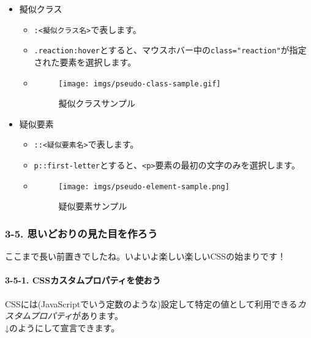 \begin{itemize}
\tightlist
\item
  擬似クラス

  \begin{itemize}
  \item
    \texttt{:\textless{}擬似クラス名\textgreater{}}で表します。
  \item
    \texttt{.reaction:hover}とすると、マウスホバー中の\texttt{class="reaction"}が指定された要素を選択します。
  \item
    \begin{figure}
    \centering
    \texttt{[image: imgs/pseudo-class-sample.gif]}
    \caption{擬似クラスサンプル}
    \end{figure}
  \end{itemize}
\item
  疑似要素

  \begin{itemize}
  \item
    \texttt{::\textless{}疑似要素名\textgreater{}}で表します。
  \item
    \texttt{p::first-letter}とすると、\texttt{\textless{}p\textgreater{}}要素の最初の文字のみを選択します。
  \item
    \begin{figure}
    \centering
    \texttt{[image: imgs/pseudo-element-sample.png]}
    \caption{疑似要素サンプル}
    \end{figure}
  \end{itemize}
\end{itemize}

\subsubsection{3-5.
思いどおりの見た目を作ろう}\label{ux601dux3044ux3069ux304aux308aux306eux898bux305fux76eeux3092ux4f5cux308dux3046}

ここまで長い前置きでしたね。いよいよ楽しい楽しいCSSの始まりです！

\paragraph{3-5-1.
CSSカスタムプロパティを使おう}\label{cssux30abux30b9ux30bfux30e0ux30d7ux30edux30d1ux30c6ux30a3ux3092ux4f7fux304aux3046}

CSSには(JavaScriptでいう定数のような)設定して特定の値として利用できる\emph{カスタムプロパティ}があります。\\
↓のようにして宣言できます。

